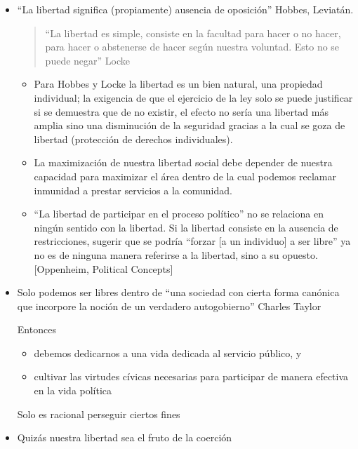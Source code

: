 \documentclass[
  letterpaper,
  DIV=11,
  numbers=noendperiod]{scrreprt}
\providecommand{\tightlist}{%
  \setlength{\itemsep}{0pt}\setlength{\parskip}{0pt}}\usepackage{longtable,booktabs,array}
\begin{document}
\begin{itemize}
\item
  ``La libertad significa (propiamente) ausencia de oposición'' Hobbes,
  Leviatán.

  \begin{quote}
  ``La libertad es simple, consiste en la facultad para hacer o no
  hacer, para hacer o abstenerse de hacer según nuestra voluntad. Esto
  no se puede negar'' Locke
  \end{quote}

  \begin{itemize}
  \tightlist
  \item
    Para Hobbes y Locke la libertad es un bien natural, una propiedad
    individual; la exigencia de que el ejercicio de la ley solo se puede
    justificar si se demuestra que de no existir, el efecto no sería una
    libertad más amplia sino una disminución de la seguridad gracias a
    la cual se goza de libertad (protección de derechos individuales).
  \end{itemize}

  \begin{itemize}
  \item
    La maximización de nuestra libertad social debe depender de nuestra
    capacidad para maximizar el área dentro de la cual podemos reclamar
    inmunidad a prestar servicios a la comunidad.
  \item
    ``La libertad de participar en el proceso político'' no se relaciona
    en ningún sentido con la libertad. Si la libertad consiste en la
    ausencia de restricciones, sugerir que se podría ``forzar {[}a un
    individuo{]} a ser libre'' ya no es de ninguna manera referirse a la
    libertad, sino a su opuesto. {[}Oppenheim, Political Concepts{]}
  \end{itemize}
\item
  Solo podemos ser libres dentro de ``una sociedad con cierta forma
  canónica que incorpore la noción de un verdadero autogobierno''
  Charles Taylor

  Entonces

  \begin{itemize}
  \item
    debemos dedicarnos a una vida dedicada al servicio público, y
  \item
    cultivar las virtudes cívicas necesarias para participar de manera
    efectiva en la vida política
  \end{itemize}

  Solo es racional perseguir ciertos fines
\item
  Quizás nuestra libertad sea el fruto de la coerción
\end{itemize}
\end{document}
